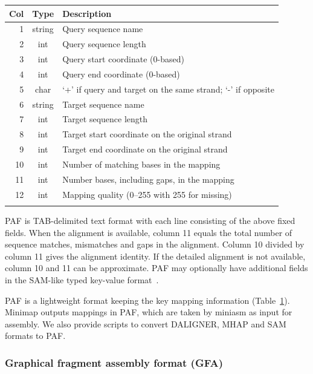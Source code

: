 \documentclass{bioinfo}
\begin{document}
\begin{methods}
\begin{table}[tb]
{\footnotesize\label{tab:paf}
\begin{tabular}{rcl}
\toprule
Col & Type & Description \\
\midrule
1 & string & Query sequence name \\
2 & int    & Query sequence length \\
3 & int    & Query start coordinate (0-based) \\
4 & int    & Query end coordinate (0-based) \\
5 & char   & `+' if query and target on the same strand; `-' if opposite \\
6 & string & Target sequence name \\
7 & int    & Target sequence length \\
8 & int    & Target start coordinate on the original strand \\
9 & int    & Target end coordinate on the original strand \\
10& int    & Number of matching bases in the mapping \\
11& int    & Number bases, including gaps, in the mapping \\
12& int    & Mapping quality (0--255 with 255 for missing) \\
\botrule
\end{tabular}
}{PAF is TAB-delimited text format with each line consisting of the above fixed
fields. When the alignment is available, column 11 equals the total number of
sequence matches, mismatches and gaps in the alignment. Column 10 divided by
column 11 gives the alignment identity. If the detailed alignment is not
available, column 10 and 11 can be approximate. PAF may optionally have
additional fields in the SAM-like typed key-value format~\citep{Li:2009ys}.}
\end{table}

PAF is a lightweight format keeping the key mapping information (Table~\ref{tab:paf}).
Minimap outputs mappings in PAF, which are taken by miniasm as input for
assembly. We also provide scripts to convert DALIGNER, MHAP and SAM formats to
PAF.

\subsubsection{Graphical fragment assembly format (GFA)}


\end{methods}
\end{document}
